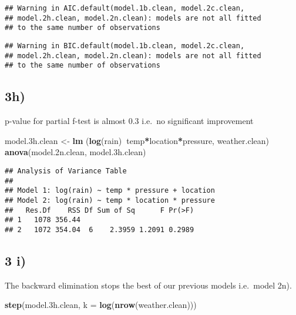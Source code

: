 \documentclass[]{article}
\newenvironment{Shaded}{\begin{snugshade}}{\end{snugshade}}
\newcommand{\DataTypeTok}[1]{\textcolor[rgb]{0.13,0.29,0.53}{#1}}
\newcommand{\FloatTok}[1]{\textcolor[rgb]{0.00,0.00,0.81}{#1}}
\newcommand{\KeywordTok}[1]{\textcolor[rgb]{0.13,0.29,0.53}{\textbf{#1}}}
\newcommand{\NormalTok}[1]{#1}
\newcommand{\OperatorTok}[1]{\textcolor[rgb]{0.81,0.36,0.00}{\textbf{#1}}}
\newcommand{\StringTok}[1]{\textcolor[rgb]{0.31,0.60,0.02}{#1}}
\begin{document}
\begin{verbatim}
## Warning in AIC.default(model.1b.clean, model.2c.clean,
## model.2h.clean, model.2n.clean): models are not all fitted
## to the same number of observations
\end{verbatim}

\begin{verbatim}
## Warning in BIC.default(model.1b.clean, model.2c.clean,
## model.2h.clean, model.2n.clean): models are not all fitted
## to the same number of observations
\end{verbatim}

\hypertarget{h}{%
\subsection{3h)}\label{h}}

p-value for partial f-test is almost 0.3 i.e.~no significant improvement

\begin{Shaded}
\begin{Highlighting}[]
\NormalTok{model}\FloatTok{.3}\NormalTok{h.clean <-}\StringTok{ }\KeywordTok{lm}\NormalTok{ (}\KeywordTok{log}\NormalTok{(rain)}\OperatorTok{~}\NormalTok{temp}\OperatorTok{*}\NormalTok{location}\OperatorTok{*}\NormalTok{pressure, weather.clean)}
\KeywordTok{anova}\NormalTok{(model}\FloatTok{.2}\NormalTok{n.clean, model}\FloatTok{.3}\NormalTok{h.clean)}
\end{Highlighting}
\end{Shaded}

\begin{verbatim}
## Analysis of Variance Table
## 
## Model 1: log(rain) ~ temp * pressure + location
## Model 2: log(rain) ~ temp * location * pressure
##   Res.Df    RSS Df Sum of Sq      F Pr(>F)
## 1   1078 356.44                           
## 2   1072 354.04  6    2.3959 1.2091 0.2989
\end{verbatim}

\hypertarget{i}{%
\subsection{3 i)}\label{i}}

The backward elimination stops the best of our previous models
i.e.~model 2n).

\begin{Shaded}
\begin{Highlighting}[]
\KeywordTok{step}\NormalTok{(model}\FloatTok{.3}\NormalTok{h.clean, }\DataTypeTok{k =} \KeywordTok{log}\NormalTok{(}\KeywordTok{nrow}\NormalTok{(weather.clean)))}
\end{Highlighting}
\end{Shaded}
\end{document}
